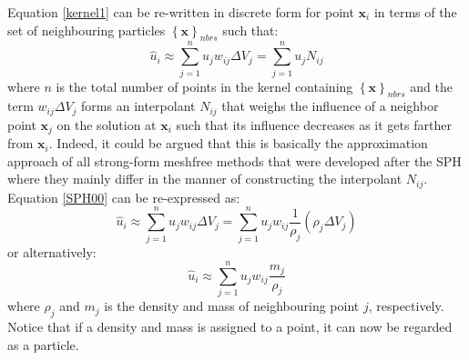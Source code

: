 \documentclass[12pt]{extarticle}
\begin{document}
\vspace{5 mm}
Equation \ref{kernel1} can be re-written in discrete form for point $\textbf{x}_i$ in terms of the set of neighbouring particles $\left \{ \textbf{x} \right \}_{nbrs}$ such that:
\begin{equation}
\hat{u}_{i} \approx \sum_{j=1}^{n} u_{j} w_{ij} \Delta V_{j} = \sum_{j=1}^{n} u_{j} N_{ij}
\label{SPH00}
\end{equation}
where $n$ is the total number of points in the kernel containing $\left \{\textbf{x} \right \}_{nbrs}$ and the term $w_{ij} \Delta V_{j}$ forms an interpolant $N_{ij}$ that weighs the influence of a neighbor point $\textbf{x}_j$ on the solution at $\textbf{x}_i$ such that its influence decreases as it gets farther from $\textbf{x}_{i}$. Indeed, it could be argued that this is basically the approximation approach of all strong-form meshfree methods that were developed after the SPH where they mainly differ in the manner of constructing the interpolant $N_{ij}$. Equation \ref{SPH00} can be re-expressed as:
\begin{equation}
\hat{u}_{i} \approx \sum_{j=1}^{n}u_{j}w_{ij} \Delta V_{j} = \sum_{j=1}^{n} u_{j} w_{ij} \frac{1}{\rho_{j}}(\rho_{j}\Delta V_{j})
\end{equation}
or alternatively:
\begin{equation}
\hat{u}_{i} \approx \sum_{j=1}^{n} u_{j} w_{ij} \frac{m_{j}}{\rho_{j}}
\end{equation}
where $\rho_{j}$ and $m_{j}$ is the density and mass of neighbouring point $j$, respectively. Notice that if a density and mass is assigned to a point, it can now be regarded as a particle. 
\end{document}
